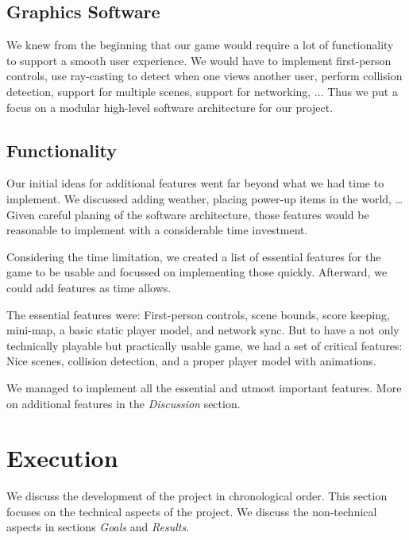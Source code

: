 \documentclass[11pt]{article}
\begin{document}
\subsection{Graphics Software}
\par We knew from the beginning that our game would require a lot of functionality to support a smooth user experience. We would have to implement first-person controls, use ray-casting to detect when one views another user, perform collision detection, support for multiple scenes, support for networking, ... Thus we put a focus on a modular high-level software architecture for our project.

\subsection{Functionality}
\par Our initial ideas for additional features went far beyond what we had time to implement. We discussed adding weather, placing power-up items in the world, … Given careful planing of the software architecture, those features would be reasonable to implement with a considerable time investment.
\par Considering the time limitation, we created a list of essential features for the game to be usable and focussed on implementing those quickly. Afterward, we could add features as time allows.
\par The essential features were: First-person controls, scene bounds, score keeping, mini-map, a basic static player model, and network sync. But to have a not only technically playable but practically usable game, we had a set of critical features: Nice scenes, collision detection, and a proper player model with animations.
\par We managed to implement all the essential and utmost important features. More on additional features in the \textit{Discussion} section.





\section{Execution}
\par We discuss the development of the project in chronological order. This section focuses on the technical aspects of the project. We discuss the non-technical aspects in sections \textit{Goals} and \textit{Results}.
\end{document}
